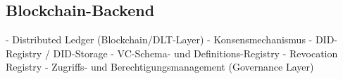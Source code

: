 \subsection{Blockchain-Backend} \label{sec:Blockchain-Backend}

- Distributed Ledger (Blockchain/DLT-Layer)
- Konsensmechanismus
- DID-Registry / DID-Storage
- VC-Schema- und Definitions-Registry
- Revocation Registry
- Zugriffs- und Berechtigungsmanagement (Governance Layer)